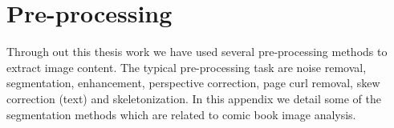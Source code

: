 \chapter{Pre-processing}
\label{app:pre-processing}
\graphicspath{{./chapters/Appendix/figs/}}


Through out this thesis work we have used several pre-processing methods to extract image content.
The typical pre-processing task are noise removal, segmentation, enhancement, perspective correction, page curl removal, skew correction (text) and skeletonization.
In this appendix we detail some of the segmentation methods which are related to comic book image analysis.






